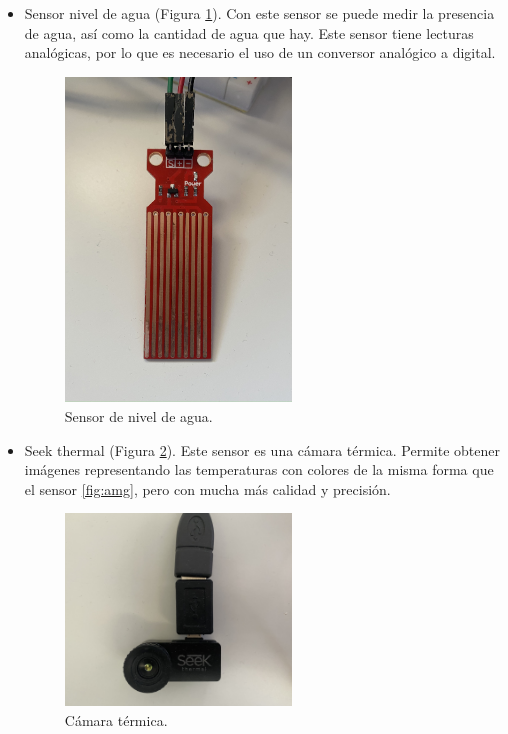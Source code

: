 \begin{itemize}
\item{Sensor nivel de agua (Figura \ref{fig:nivel}).} Con este sensor se puede medir la presencia de agua, así como la cantidad de agua que hay. Este sensor tiene lecturas analógicas, por lo que es necesario el uso de un conversor analógico a digital.
\begin{figure} [h!]
  \begin{center}
    \includegraphics[width=6cm]{figs/nivel}
  \end{center}
  \caption{Sensor de nivel de agua.}
  \label{fig:nivel}
\end{figure}


\item{Seek thermal (Figura \ref{fig:seek}).} Este sensor es una cámara térmica. Permite obtener imágenes representando las temperaturas con colores de la misma forma que el sensor \ref{fig:amg}, pero con mucha más calidad y precisión.\begin{figure} [h!]
  \begin{center}
    \includegraphics[width=6cm]{figs/seek}
  \end{center}
  \caption{Cámara térmica.}
  \label{fig:seek}
\end{figure}


\end{itemize}
